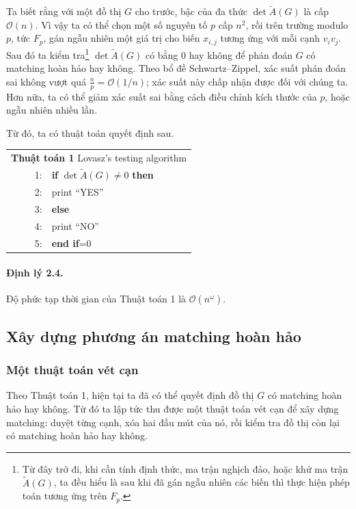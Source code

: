 \documentclass[11pt]{article}
\newcommand{\Oh}{\mathcal{O}}
\begin{document}
Ta biết rằng với một đồ thị \(G\) cho trước, bậc của đa thức
\(\det\tilde A(G)\) là cấp \(\Oh(n)\). Vì vậy ta có thể chọn một số nguyên tố
\(p\) cấp \(n^2\), rồi trên trường modulo \(p\), tức \(F_p\), gán ngẫu nhiên
một giá trị cho biến \(x_{i,j}\) tương ứng với mỗi cạnh \(v_iv_j\). Sau đó ta
kiểm tra\footnote{Từ đây trở đi, khi cần tính định thức, ma trận nghịch đảo,
hoặc khử ma trận \(\tilde A(G)\), ta đều hiểu là sau khi đã gán ngẫu nhiên các
biến thì thực hiện phép toán tương ứng trên \(F_p\).} \(\det\tilde A(G)\) có
bằng \(0\) hay không để phán đoán \(G\) có matching hoàn hảo hay không. Theo bổ
đề Schwartz--Zippel, xác suất phán đoán sai không vượt quá
\(\frac{n}{p}=\Oh(1/n)\); xác suất này chấp nhận được đối với chúng ta. Hơn
nữa, ta có thể giảm xác suất sai bằng cách điều chỉnh kích thước của \(p\),
hoặc ngẫu nhiên nhiều lần.

Từ đó, ta có thuật toán quyết định sau.

\begin{center}
\small
\begin{tabular}{r@{\quad}p{0.78\linewidth}}
\multicolumn{2}{l}{\textbf{Thuật toán 1} Lovasz's testing algorithm}\\
1: & \textbf{if} \(\det\tilde A(G)\ne 0\) \textbf{then}\\
2: & \quad print ``YES''\\
3: & \textbf{else}\\
4: & \quad print ``NO''\\
5: & \textbf{end if}=0
\end{tabular}
\end{center}

\paragraph{Định lý 2.4.}
Độ phức tạp thời gian của Thuật toán 1 là \(\Oh(n^\omega)\).

\subsection{Xây dựng phương án matching hoàn hảo}

\subsubsection{Một thuật toán vét cạn}

Theo Thuật toán 1, hiện tại ta đã có thể quyết định đồ thị \(G\) có matching
hoàn hảo hay không. Từ đó ta lập tức thu được một thuật toán vét cạn để xây
dựng matching: duyệt từng cạnh, xóa hai đầu mút của nó, rồi kiểm tra đồ thị
còn lại có matching hoàn hảo hay không.
\end{document}
